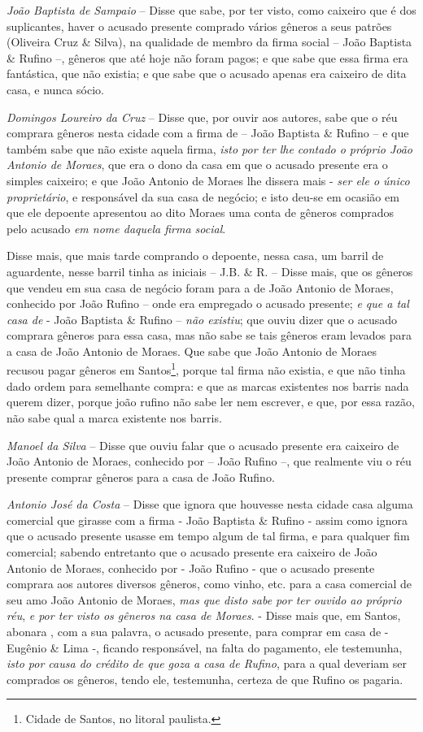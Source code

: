 {\emph{João Baptista de Sampaio} -- Disse que sabe, por ter visto, como
caixeiro que é dos suplicantes, haver o acusado presente comprado vários
gêneros a seus patrões (Oliveira Cruz \& Silva), na qualidade de membro
da firma social -- João Baptista \& Rufino --, gêneros que até hoje não
foram pagos; e que sabe que essa firma era fantástica, que não existia;
e que sabe que o acusado apenas era caixeiro de dita casa, e nunca
sócio.

\emph{Domingos Loureiro da Cruz} -- Disse que, por ouvir aos autores,
sabe que o réu comprara gêneros nesta cidade com a firma de -- João
Baptista \& Rufino -- e que também sabe que não existe aquela firma,
\emph{isto por ter lhe contado o próprio João Antonio de Moraes}, que
era o dono da casa em que o acusado presente era o simples caixeiro; e
que João Antonio de Moraes lhe dissera mais - \emph{ser ele o único
proprietário}, e responsável da sua casa de negócio; e isto deu-se em
ocasião em que ele depoente apresentou ao dito Moraes uma conta de
gêneros comprados pelo acusado \emph{em nome daquela firma social}.

Disse mais, que mais tarde comprando o depoente, nessa casa, um barril
de aguardente, nesse barril tinha as iniciais -- J.B. \& R. -- Disse
mais, que os gêneros que vendeu em sua casa de negócio foram para a de
João Antonio de Moraes, conhecido por João Rufino -- onde era empregado
o acusado presente; \emph{e que a tal casa de} - João Baptista \& Rufino
-- \emph{não existiu}; que ouviu dizer que o acusado comprara gêneros
para essa casa, mas não sabe se tais gêneros eram levados para a casa de
João Antonio de Moraes. Que sabe que João Antonio de Moraes recusou
pagar gêneros em Santos\footnote{ Cidade de Santos, no litoral
  paulista.}, porque tal firma não existia, e que não tinha dado ordem
para semelhante compra: e que as marcas existentes nos barris nada
querem dizer, porque joão rufino não sabe ler nem escrever, e que, por
essa razão, não sabe qual a marca existente nos barris.

\emph{Manoel da Silva} -- Disse que ouviu falar que o acusado presente
era caixeiro de João Antonio de Moraes, conhecido por -- João Rufino --,
que realmente viu o réu presente comprar gêneros para a casa de João
Rufino.

\emph{Antonio José da Costa} -- Disse que ignora que houvesse nesta
cidade casa alguma comercial que girasse com a firma - João Baptista \&
Rufino - assim como ignora que o acusado presente usasse em tempo algum
de tal firma, e para qualquer fim comercial; sabendo entretanto que o
acusado presente era caixeiro de João Antonio de Moraes, conhecido por -
João Rufino - que o acusado presente comprara aos autores diversos
gêneros, como vinho, etc. para a casa comercial de seu amo João Antonio
de Moraes, \emph{mas que disto sabe por ter ouvido ao próprio réu},
\emph{e por ter visto os gêneros na casa de Moraes}. - Disse mais que,
em Santos, abonara , com a sua palavra, o acusado presente, para comprar
em casa de - Eugênio \& Lima -, ficando responsável, na falta do
pagamento, ele testemunha, \emph{isto por causa do crédito de que goza a
casa de Rufino}, para a qual deveriam ser comprados os gêneros, tendo
ele, testemunha, certeza de que Rufino os pagaria.

}
